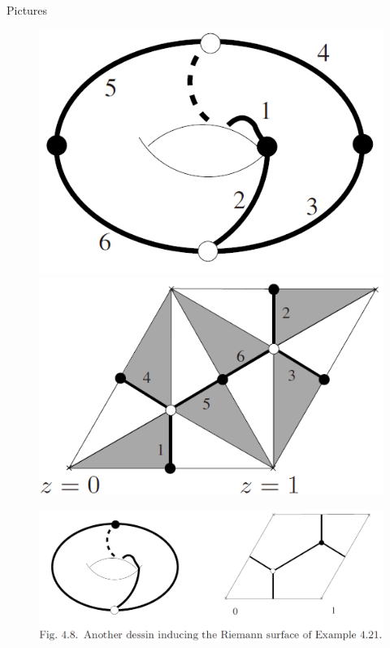 \documentclass[pdf]{beamer}
\numberwithin{equation}{section}
\theoremstyle{plain}
\theoremstyle{plain}
\theoremstyle{remark}
\begin{document}
\begin{frame}[fragile]{Pictures}
\begin{figure}[th]
	\begin{minipage}[b]{.35\textwidth}
		\centering
		\includegraphics[height=.3\textheight]{figures/Fig4-3.png}
	\end{minipage}
	\begin{minipage}[b]{.4\textwidth}
	\centering
	\includegraphics[height=.3\textheight]{figures/Fig4-6.png}
\end{minipage}
\end{figure}
	\begin{figure}[th]
	\begin{minipage}[b]{\textwidth}
		\centering
		\includegraphics[height=.33\textheight]{figures/Fig4-8.png}
	\end{minipage}
\end{figure}
\end{frame}
\end{document}
